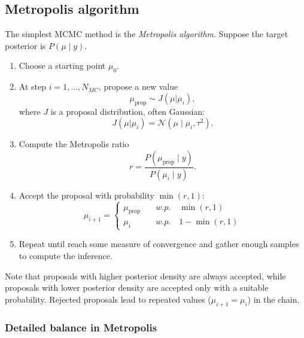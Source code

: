 \documentclass[11pt, titlepage]{article} %
\numberwithin{equation}{section}
\theoremstyle{definition}
\numberwithin{assumption}{section}
\begin{document}
\subsection{Metropolis algorithm}

The simplest MCMC method is the \textit{Metropolis algorithm}. Suppose the target posterior is $P(\mu\mid y)$.

\begin{enumerate}
    \item Choose a starting point $\mu_0$.
    \item At step $i=1,\dots,N_{MC}$, propose a new value
    \begin{equation*}
        \mu_{\mathrm{prop}}\sim J(\mu|\mu_i),
    \end{equation*}
    where $J$ is a proposal distribution, often Gaussian:
    \begin{equation*}
        J(\mu|\mu_i)=\mathcal{N}(\mu\mid\mu_i,\tau^2).
    \end{equation*}
    \item Compute the Metropolis ratio
    \begin{equation*}
        r=\frac{P(\mu_{\mathrm{prop}}\mid y)}{P(\mu_i\mid y)}.
    \end{equation*}
    \item Accept the proposal with probability $\min(r,1)$:
    \begin{equation*}
        \mu_{i+1}=\begin{cases}
            \mu_{\mathrm{prop}}\quad &w.p. \quad \min(r,1)\\
            \mu_i\quad &w.p.\quad 1-\min(r,1)
        \end{cases}
    \end{equation*}
    \item Repeat until reach some measure of convergence and gather enough samples to compute the inference.
\end{enumerate}

Note that proposals with higher posterior density are always accepted, while proposals with lower posterior density are accepted only with a suitable probability. Rejected proposals lead to repeated values ($\mu_{i+1}=\mu_i$) in the chain.

\subsubsection*{Detailed balance in Metropolis}
\end{document}
